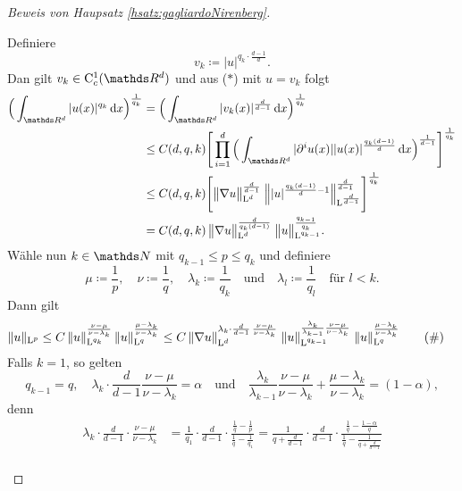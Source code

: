 \begin{proof}[Beweis von Haupsatz \ref{hsatz:gagliardoNirenberg}]
\begin{enumerate}
      Definiere
      $$
      v_k \coloneqq |u|^{q_k \cdot \frac{d - 1}{d}}.
      $$
      Dan gilt $v_k \in \CC_c^1(\R^d)$ und aus ($\ast$) mit $u = v_k$ folgt
      \begin{align*}
        \Big( \int_{\R^d} |u(x)|^{q_k} \d x \Big)^{\frac{1}{q_k}}
        &= \Big( \int_{\R^d} |v_k(x)|^{\frac{d}{d - 1}} \d x \Big)^{\frac{1}{q_k}} \\
        &\leq C(d,q,k) \Bigg[ \prod_{i = 1}^d \Big( \int_{\R^d} |\partial^i u(x)||u(x)|^{\frac{q_k(d - 1)}{d }} \d x \Big)^{\frac{1}{d - 1}} \Bigg]^{\frac{1}{q_k}} \\
        &\leq C(d,q,k) \Bigg[ \big\|\nabla u\big\|_{\Ell^d}^{\frac{d}{d - 1 }} \; \Big\| |u|^{\frac{q_k (d - 1)}{d} - 1} \Big\|_{\Ell^{\frac{d}{d - 1}}}^{\frac{d}{d - 1}} \Bigg]^{\frac{1}{q_k}} \\
        &= C(d,q,k) \, \big\|\nabla u\big\|_{\Ell^d}^{\frac{d}{q_k (d - 1)}} \; \big\|u\big\|_{\Ell^{q_{k - 1}}}^{\frac{q_{k - 1}}{q_k}}.
      \end{align*}
      Wähle nun $k \in \N$ mit $q_{k - 1} \leq p \leq q_k$ und definiere 
      $$
      \mu \coloneqq \frac{1}{p}, \quad \nu \coloneqq \frac{1}{q}, \quad \lambda_k \coloneqq \frac{1}{q_k} \quad\text{und}\quad \lambda_l \coloneqq \frac{1}{q_l} \quad\text{für } l < k.
      $$
      Dann gilt
      \begin{align*}
        \|u\|_{\mathrm{L}^p}
        &\leq C \, \|u\|_{\mathrm{L}^{q_k}}^{\frac{\nu - \mu}{\nu - \lambda_k}} \, \|u\|_{\mathrm{L}^q}^{\frac{\mu - \lambda_k}{\nu - \lambda_k}} 
        \leq C \, \|\nabla u\|_{\mathrm{L}^d}^{\lambda_k \cdot \frac{d}{d - 1} \, \frac{\nu - \mu}{\nu - \lambda_k}} \; \|u\|_{\mathrm{L}^{q_{k - 1}}}^{\frac{\lambda_k}{\lambda_{k - 1}} \frac{\nu - \mu}{\nu - \lambda_k}}  \; \|u\|_{\mathrm{L}^{q}}^{\frac{\mu - \lambda_k}{\nu - \lambda_k}}  \tag{\#}
      \end{align*}
      Falls $k = 1$, so gelten 
      $$
      q_{k - 1} = q, \quad \lambda_k \cdot \frac{d}{d - 1}\frac{\nu - \mu}{\nu - \lambda_k} = \alpha \quad\text{und}\quad \frac{\lambda_k}{\lambda_{k - 1}} \frac{\nu - \mu}{\nu - \lambda_k} + \frac{\mu - \lambda_k}{\nu - \lambda_k}=  (1 - \alpha),
      $$
      denn
      \begin{align*}
      \lambda_k \cdot \frac{d}{d - 1} \cdot \frac{\nu - \mu}{\nu - \lambda_k}
        &= \frac{1}{q_1} \cdot \frac{d}{d - 1} \cdot \frac{\frac{1}{q} - \frac{1}{p}}{\frac{1}{q} - \frac{1}{q_1}} 
        = \frac{1}{q + \frac{d}{d - 1}} \cdot \frac{d}{d - 1} \cdot \frac{\frac{1}{q} - \frac{1 - \alpha}{q}}{\frac{1}{q} - \frac{1}{q + \frac{d}{d - 1}}}  \\

\end{align*}
\end{enumerate}
\end{proof}
